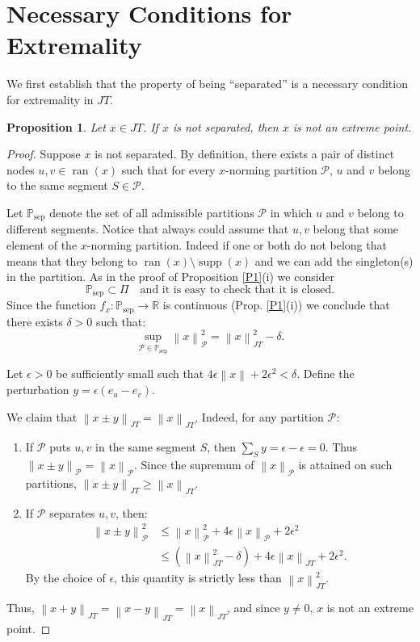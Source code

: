 \documentclass[11pt,a4paper]{amsart}
\newtheorem{proposition}[theorem]{Proposition}
\newcommand{\JT}{JT}
\newcommand{\norm}[1]{\left\lVert#1\right\rVert}
\newcommand{\supp}{\operatorname{supp}}
\newcommand{\ran}{\operatorname{ran}}
\begin{document}
\section{Necessary Conditions for Extremality}

We first establish that the property of being ``separated'' is a necessary condition for extremality in $\JT$.

\begin{proposition}\label{prop:not_sep_not_ext}
    Let $x \in \JT$. If $x$ is not separated, then $x$ is not an extreme point.
\end{proposition}

\begin{proof}
    Suppose $x$ is not separated. By definition, there exists a pair of distinct nodes $u, v \in \ran(x)$ such that for every $x$-norming partition $\mathcal{P}$, $u$ and $v$ belong to the same segment $S \in \mathcal{P}$.
    
    Let $\mathbb{P}_{\text{sep}}$ denote the set of all admissible partitions $\mathcal{P}$ in which $u$ and $v$ belong to different segments. Notice that always could assume that $u,v$ belong that some element of the $x$-norming partition. Indeed if one or both do not belong that means that they belong to $\ran(x) \setminus \supp(x)$ and we can add the singleton(s) in the partition. As in the proof of Proposition \ref{P1}(i) we consider  
    \[ \mathbb{P}_{\text{sep}}\subset \Pi  \quad \text{and it is  easy to check that  it is closed.} \]
    Since the function $f_x :  \mathbb{P}_{\text{sep}} \to \mathbb{R} $ is continuous (Prop. \ref{P1}(i)) we conclude that  there exists $\delta > 0$ such that:
    \[ \sup_{\mathcal{P} \in \mathbb{P}_{\text{sep}}} \norm{x}_{\mathcal{P}}^2 = \norm{x}_{\JT}^2 - \delta. \]
    
    Let $\epsilon > 0$ be sufficiently small such that $4\epsilon \norm{x} + 2\epsilon^2 < \delta$. Define the perturbation $y = \epsilon(e_u - e_v)$.
    
    We claim that $\norm{x \pm y}_{\JT} = \norm{x}_{\JT}$. Indeed, for any partition $\mathcal{P}$:
    \begin{enumerate}
        \item If $\mathcal{P}$ puts $u, v$ in the same segment $S$, then $\sum_{S} y = \epsilon - \epsilon = 0$. Thus $\norm{x \pm y}_{\mathcal{P}} = \norm{x}_{\mathcal{P}}$. Since the supremum of $\norm{x}_{\mathcal{P}}$ is attained on such partitions, $\norm{x \pm y}_{\JT} \ge \norm{x}_{\JT}$.
        \item If $\mathcal{P}$ separates $u, v$, then:
        \begin{align*}
            \norm{x \pm y}_{\mathcal{P}}^2 &\le \norm{x}_{\mathcal{P}}^2 + 4\epsilon\norm{x}_{\mathcal{P}} + 2\epsilon^2 \\
            &\le (\norm{x}_{\JT}^2 - \delta) + 4\epsilon\norm{x}_{\JT} + 2\epsilon^2.
        \end{align*}
        By the choice of $\epsilon$, this quantity is strictly less than $\norm{x}_{\JT}^2$.
    \end{enumerate}
    Thus, $\norm{x+y}_{\JT} = \norm{x-y}_{\JT} = \norm{x}_{\JT}$, and since $y \neq 0$, $x$ is not an extreme point.
\end{proof}
\end{document}
